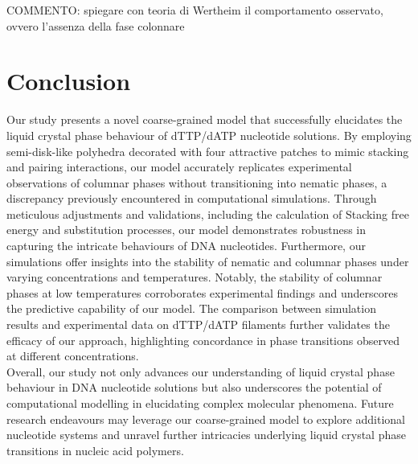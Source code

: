 \documentclass[aip,jcp, amsmath, amssymb, reprint]{revtex4-1}
\begin{document}
{\color{green}COMMENTO: spiegare con teoria di Wertheim il comportamento osservato, ovvero
l'assenza della fase colonnare}



\section{\label{Dis}Conclusion}

Our study presents a novel coarse-grained model that successfully elucidates the liquid crystal phase behaviour of dTTP/dATP nucleotide solutions. By employing semi-disk-like polyhedra decorated with four attractive patches to mimic stacking and pairing interactions, our model accurately replicates experimental observations of columnar phases without transitioning into nematic phases, a discrepancy previously encountered in computational simulations. Through meticulous adjustments and validations, including the calculation of Stacking free energy and substitution processes, our model demonstrates robustness in capturing the intricate behaviours of DNA nucleotides. Furthermore, our simulations offer insights into the stability of nematic and columnar phases under varying concentrations and temperatures. Notably, the stability of columnar phases at low temperatures corroborates experimental findings and underscores the predictive capability of our model. The comparison between simulation results and experimental data on dTTP/dATP filaments further validates the efficacy of our approach, highlighting concordance in phase transitions observed at different concentrations. \\

Overall, our study not only advances our understanding of liquid crystal phase behaviour in DNA nucleotide solutions but also underscores the potential of computational modelling in elucidating complex molecular phenomena. Future research endeavours may leverage our coarse-grained model to explore additional nucleotide systems and unravel further intricacies underlying liquid crystal phase transitions in nucleic acid polymers.



\end{document}
